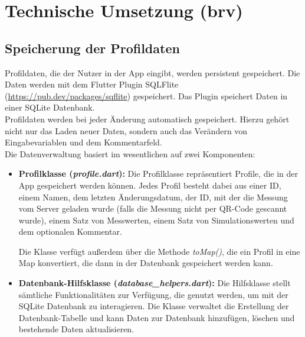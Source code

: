 \chapter{Technische Umsetzung (brv)}
\label{chap:technUmsetzung}

	\section{Speicherung der Profildaten}
	\label{sec:speicherungProfildaten}
	
	Profildaten, die der Nutzer in der App eingibt, werden persistent gespeichert. Die Daten werden mit dem Flutter Plugin SQLFlite (\hyperlink{https://pub.dev/packages/sqflite}{https://pub.dev/packages/sqflite}) gespeichert. Das Plugin speichert Daten in einer SQLite Datenbank.
	\\
	Profildaten werden bei jeder Änderung automatisch gespeichert. Hierzu gehört nicht nur das Laden neuer Daten, sondern auch das Verändern von Eingabevariablen und dem Kommentarfeld.
	\\
	Die Datenverwaltung basiert im wesentlichen auf zwei Komponenten:
	
	\begin{itemize}
		\item \textbf{Profilklasse (\textit{profile.dart}):} Die Profilklasse repräsentiert Profile, die in der App gespeichert werden können. Jedes Profil besteht dabei aus einer ID, einem Namen, dem letzten Änderungsdatum, der ID, mit der die Messung vom Server geladen wurde (falls die Messung nicht per QR-Code gescannt wurde), einem Satz von Messwerten, einem Satz von Simulationswerten und dem optionalen Kommentar.
		
		Die Klasse verfügt außerdem über die Methode \textit{toMap()}, die ein Profil in eine Map konvertiert, die dann in der Datenbank gespeichert werden kann.				

		\item \textbf{Datenbank-Hilfsklasse (\textit{database\_helpers.dart}):} Die Hilfsklasse stellt sämtliche Funktionalitäten zur Verfügung, die genutzt werden, um mit der SQLite Datenbank zu interagieren. Die Klasse verwaltet die Erstellung der Datenbank-Tabelle und kann Daten zur Datenbank hinzufügen, löschen und bestehende Daten aktualisieren.
		
	\end{itemize}

